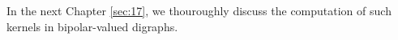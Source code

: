 In the next Chapter \vref{sec:17}, we thouroughly discuss the computation of such kernels in bipolar-valued digraphs.

\clearpage


%